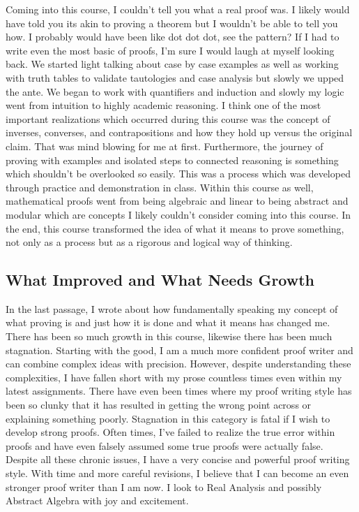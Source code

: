 \documentclass{article}
\begin{document}
\begin{center}
\justifying
Coming into this course, I couldn't tell you what a real proof was. I likely would have told you its akin to proving a theorem but I wouldn't be able to tell you how. I probably would have been like dot dot dot, see the pattern? If I had to write even the most basic of proofs, I'm sure I would laugh at myself looking back. We started light talking about case by case examples as well as working with truth tables to validate tautologies and case analysis but slowly we upped the ante. We began to work with quantifiers and induction and slowly my logic went from intuition to highly academic reasoning. I think one of the most important realizations which occurred during this course was the concept of inverses, converses, and contrapositions and how they hold up versus the original claim. That was mind blowing for me at first. Furthermore, the journey of proving with examples and isolated steps to connected reasoning is something which shouldn't be overlooked so easily. This was a process which was developed through practice and demonstration in class. Within this course as well, mathematical proofs went from being algebraic and linear to being abstract and modular which are concepts I likely couldn't consider coming into this course. In the end, this course transformed the idea of what it means to prove something, not only as a process but as a rigorous and logical way of thinking.
\end{center}


\subsection*{What Improved and What Needs Growth}

\begin{center}
\justifying
In the last passage, I wrote about how fundamentally speaking my concept of what proving is and just how it is done and what it means has changed me. There has been so much growth in this course, likewise there has been much stagnation. Starting with the good, I am a much more confident proof writer and can combine complex ideas with precision. However, despite understanding these complexities, I have fallen short with my prose countless times even within my latest assignments. There have even been times where my proof writing style has been so clunky that it has resulted in getting the wrong point across or explaining something poorly. Stagnation in this category is fatal if I wish to develop strong proofs. Often times, I've failed to realize the true error within proofs and have even falsely assumed some true proofs were actually false. Despite all these chronic issues,  I have a very concise and powerful proof writing style. With time and more careful revisions, I believe that I can become an even stronger proof writer than I am now. I look to Real Analysis and possibly Abstract Algebra with joy and excitement.

\end{center}
\newpage
\fancyhf{}
\pagestyle{fancy}
\fancyfoot[R]{\thepage} 
\fancyhead[R]{\parbox{6cm}{\centering \raggedleft  \leftmark}}  
\end{document}
